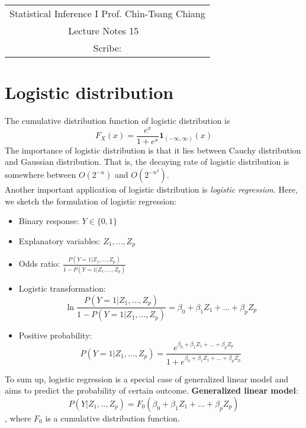 \documentclass[../Distributions.tex]{subfiles}
\begin{document}
	\begin{center}
		\renewcommand{\arraystretch}{2}
		\begin{bfseries}
			\begin{tabular}{|c|}
				\hline
				Statistical Inference I \hfill Prof. Chin-Tsang Chiang\\
				\hspace{15em} {\large Lecture Notes 15} \hspace{15em}\ \\
				\lecdate \hfill Scribe: \scribe\\
				\hline
			\end{tabular}
			\renewcommand{\arraystretch}{1}
		\end{bfseries}
	\end{center}

\section{Logistic distribution}
The cumulative distribution function of logistic distribution is
$$F_X(x) = \frac{e^x}{1+e^x}\mathbf{1}_{(-\infty,\infty)}(x)$$
The importance of logistic distribution is that it lies between Cauchy distribution and Gaussian distribution. That is, the decaying rate of logistic distribution is somewhere between $O(2^{-n})$ and $O(2^{-n^2})$.\\

Another important application of logistic distribution is {\it logistic regression}. Here, we sketch the formulation of logistic regression:
\begin{itemize}
	\item Binary response: $Y\in\{0,1\}$
	\item Explanatory variables: $Z_1,...,Z_p$
	\item Odds ratio: $\frac{P(Y=1|Z_1,...,Z_p)}{1-P(Y=1|Z_1,...,Z_p)}$
	\item Logistic transformation:
	$$\ln \frac{P(Y=1|Z_1,...,Z_p)}{1-P(Y=1|Z_1,...,Z_p)} = \beta_0 + \beta_1Z_1 + ... + \beta_p Z_p$$
	\item Positive probability:
	$$P(Y=1|Z_1,...,Z_p) = \frac{e^{\beta_0 + \beta_1Z_1 + ... + \beta_p Z_p}}{1+e^{\beta_0 + \beta_1Z_1 + ... + \beta_p Z_p}}$$
\end{itemize}
To sum up, logistic regression is a special case of generalized linear model and aims to predict the probability of certain outcome.
{\bf Generalized linear model}:
$$P(Y|Z_1,..,Z_p) = F_0(\beta_0+\beta_1Z_1+...+\beta_p Z_p)$$
, where $F_0$ is a cumulative distribution function.
\end{document}
